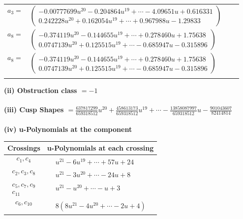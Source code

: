 \documentclass[1p]{elsarticle_modified}
\theoremstyle{definition}
\begin{document}
\begin{tabular}{m{7pt} m{180pt} m{7pt} m{180pt} }
\flushright $a_{3}=$&$\begin{pmatrix}-0.00777699 u^{20}-0.204864 u^{19}+\cdots-4.09651 u+0.616331\\0.242228 u^{20}+0.162054 u^{19}+\cdots+0.967988 u-1.29833\end{pmatrix}$ \\
\flushright $a_{8}=$&$\begin{pmatrix}-0.374119 u^{20}-0.144655 u^{19}+\cdots+0.278460 u+1.75638\\0.0747139 u^{20}+0.125515 u^{19}+\cdots-0.685947 u-0.315896\end{pmatrix}$\\ \flushright $a_{8}=$&$\begin{pmatrix}-0.374119 u^{20}-0.144655 u^{19}+\cdots+0.278460 u+1.75638\\0.0747139 u^{20}+0.125515 u^{19}+\cdots-0.685947 u-0.315896\end{pmatrix}$\\&\end{tabular}
\flushleft \textbf{(ii) Obstruction class $= -1$}\\~\\
\flushleft \textbf{(iii) Cusp Shapes $= \frac{637817299}{659318512} u^{20}+\frac{458613173}{659318512} u^{19}+\cdots-\frac{13858087997}{659318512} u-\frac{901043607}{82414814}$}\\~\\
\newpage\renewcommand{\arraystretch}{1}
\flushleft \textbf{(iv) u-Polynomials at the component}\newline \\
\begin{tabular}{m{50pt}|m{274pt}}
Crossings & \hspace{64pt}u-Polynomials at each crossing \\
\hline $$\begin{aligned}c_{1},c_{4}\end{aligned}$$&$\begin{aligned}
&u^{21}-6 u^{19}+\cdots+57 u+24
\end{aligned}$\\
\hline $$\begin{aligned}c_{2},c_{3},c_{8}\end{aligned}$$&$\begin{aligned}
&u^{21}-3 u^{20}+\cdots-24 u+8
\end{aligned}$\\
\hline $$\begin{aligned}c_{5},c_{7},c_{9}\\c_{11}\end{aligned}$$&$\begin{aligned}
&u^{21}- u^{20}+\cdots- u+3
\end{aligned}$\\
\hline $$\begin{aligned}c_{6},c_{10}\end{aligned}$$&$\begin{aligned}
&8(8 u^{21}-4 u^{20}+\cdots-2 u+4)
\end{aligned}$\\
\hline
\end{tabular}\\~\\
\end{document}
